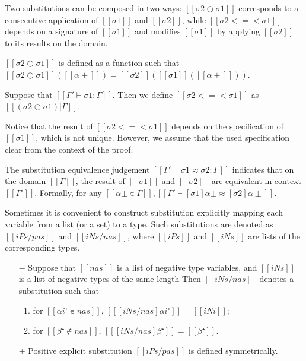 \documentclass[a4,natbib=false]{article}
\begin{document}
Two substitutions can be composed in two ways:
$[[σ2 ○ σ1]]$ corresponds to a consecutive application of $[[σ1]]$ and $[[σ2]]$,
while $[[σ2 <=< σ1]]$
depends on a signature of $[[σ1]]$ and modifies $[[σ1]]$ by applying
$[[σ2]]$ to its results on the domain.
\begin{definition}
  $[[σ2 ○ σ1]]$ is defined as a function such that
  $[[σ2 ○ σ1]]([[α± ]]) = [[σ2]]([[σ1]]([[α± ]]))$.
\end{definition}

\begin{definition}
  Suppose that $[[Γ' ⊢ σ1 : Γ]]$.
  Then we define $[[σ2 <=< σ1]]$ as $[[(σ2 ○ σ1)|Γ]]$.
\end{definition}
Notice that the result of $[[σ2 <=< σ1]]$ depends on the 
specification of $[[σ1]]$, which is not unique. 
However, we assume that the used specification clear from the 
context of the proof. 

\begin{definition}
  The substitution equivalence judgement $[[Γ' ⊢ σ1 ≈ σ2 : Γ]]$ 
  indicates that on the domain $[[Γ]]$, 
  the result of $[[σ1]]$ and $[[σ2]]$ are equivalent in context $[[Γ']]$.
  Formally, for any $[[α± ∊ Γ]], [[ Γ' ⊢ [σ1]α± ≈ [σ2]α± ]]$.
\end{definition}

Sometimes it is convenient to construct substitution 
explicitly mapping each variable from a list (or a set)
to a type. Such substitutions are denoted as $[[iPs / pas]]$
and $[[iNs / nas]]$, where $[[iPs]]$ and $[[iNs]]$ are lists of 
the corresponding types.
\begin{definition}
  \hfill
  \begin{itemize}
    \item [$-$]
      Suppose that $[[nas]]$ is a list of negative type variables,
      and $[[iNs]]$ is a list of negative types of the same length 
      Then $[[iNs / nas]]$ denotes a substitution such that 
      \begin{enumerate}
        \item for $[[αi⁺ ∊ {nas}]]$, $[[ [iNs / nas] αi⁺]] = [[iNi]]$;
        \item for $[[β⁺ ∉ {nas}]]$, $[[ [iNs / nas] β⁺]] = [[β⁺]]$.
      \end{enumerate}
    \item [$+$]
      Positive explicit substitution $[[iPs / pas]]$
      is defined symmetrically.
  \end{itemize}
\end{definition}
\end{document}
